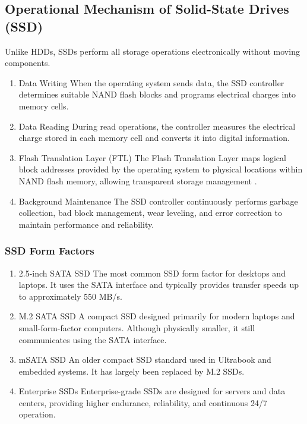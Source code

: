 \subsection{Operational Mechanism of Solid-State Drives (SSD)}
Unlike HDDs, SSDs perform all storage operations electronically without moving components\cite{gfg_disk_mgmt}.

\begin{enumerate}[label=\roman*.]

    \item Data Writing
    When the operating system sends data, the SSD controller determines suitable NAND flash blocks and
    programs electrical charges into memory cells\cite{openai2026nvmearchitecture}.

    \item  Data Reading
    During read operations, the controller measures the electrical charge stored in each memory cell and converts
    it into digital information\cite{openai2026nvmearchitecture}.

    \item  Flash Translation Layer (FTL)
    The Flash Translation Layer maps logical block addresses provided by the operating system to physical
    locations within NAND flash memory, allowing transparent storage management \cite{lexar_nvme, openai2026nvmearchitecture}.

    \item Background Maintenance
    The SSD controller continuously performs garbage collection, bad block management, wear leveling, and error
    correction to maintain performance and reliability\cite{lexar_nvme}.

\end{enumerate}

\subsubsection{SSD Form Factors}

\begin{enumerate}[label=\roman*.]
    \item  2.5-inch SATA SSD
    The most common SSD form factor for desktops and laptops. It uses the SATA interface and typically provides
    transfer speeds up to approximately 550 MB/s\cite{gfg_storage_structure}.
    
    \item M.2 SATA SSD
    A compact SSD designed primarily for modern laptops and small-form-factor computers. Although physically
    smaller, it still communicates using the SATA interface\cite{lexar_nvme}.
    
    
    \item  mSATA SSD
    An older compact SSD standard used in Ultrabook and embedded systems. It has largely been replaced by M.2
    SSDs\cite{gfg_storage_structure}.
    \item Enterprise SSDs
    Enterprise-grade SSDs are designed for servers and data centers, providing higher endurance, reliability, and
    continuous 24/7 operation\cite{gfg_disk_mgmt}.
\end{enumerate}


